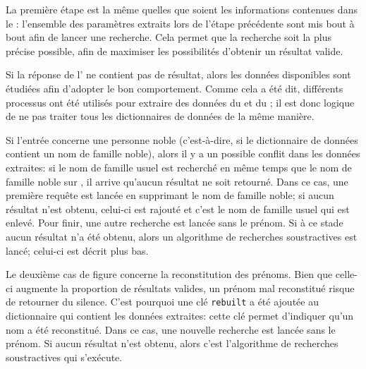 La première étape est la même quelles que soient les informations contenues dans le \tname{}: l'ensemble des paramètres extraits lors de l'étape précédente sont mis bout à bout afin de lancer une recherche. Cela permet que la recherche soit la plus précise possible, afin de maximiser les possibilités d'obtenir un résultat valide.

Si la réponse de l'\api{} ne contient pas de résultat, alors les données disponibles sont étudiées afin d'adopter le bon comportement. Comme cela a été dit, différents processus ont été utilisés pour extraire des données du \tname{} et du \ttrait{}; il est donc logique de ne pas traiter tous les \glspl{dictionnaire} de données de la même manière.

Si l'entrée concerne une personne noble (c'est-à-dire, si le dictionnaire de données contient un nom de famille noble), alors il y a un possible conflit dans les données extraites: si le nom de famille usuel est recherché en même temps que le nom de famille noble sur \wkd{}, il arrive qu'aucun résultat ne soit retourné. Dans ce cas, une première requête est lancée en supprimant le nom de famille noble; si aucun résultat n'est obtenu, celui-ci est rajouté et c'est le nom de famille usuel qui est enlevé. Pour finir, une autre recherche est lancée sans le prénom. Si à ce stade aucun résultat n'a été obtenu, alors un algorithme de recherches soustractives est lancé; celui-ci est décrit plus bas.

Le deuxième cas de figure concerne la reconstitution des prénoms. Bien que celle-ci augmente la proportion de résultats valides, un prénom mal reconstitué risque de retourner du silence. C'est pourquoi une clé \texttt{rebuilt} a été ajoutée au \gls{dictionnaire} qui contient les données extraites: cette clé permet d'indiquer qu'un nom a été reconstitué. Dans ce cas, une nouvelle recherche est lancée sans le prénom. Si aucun résultat n'est obtenu, alors c'est l'algorithme de recherches soustractives qui s'exécute.

